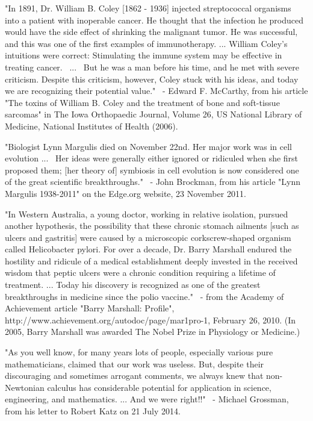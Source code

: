 \documentclass[12pt]{article}
\begin{document}
"In 1891, Dr. William B. Coley [1862 - 1936] injected streptococcal organisms into a patient with inoperable cancer. He thought that the infection he produced would have the side effect of shrinking the malignant tumor. He was successful, and this was one of the first examples of immunotherapy. ... William Coley's intuitions were correct: Stimulating the immune system may be effective in treating cancer.  ...  But he was a man before his time, and he met with severe criticism. Despite this criticism, however, Coley stuck with his ideas, and today we are recognizing their potential value."
 - Edward F. McCarthy, from his article "The toxins of William B. Coley and the treatment of bone and soft-tissue sarcomas" in The Iowa Orthopaedic Journal, Volume 26, US National Library of Medicine, National Institutes of Health (2006).

"Biologist Lynn Margulis died on November 22nd. Her major work was in cell evolution ...  Her ideas were generally either ignored or ridiculed when she first proposed them; [her theory of] symbiosis in cell evolution is now considered one of the great scientific breakthroughs."
 - John Brockman, from his article "Lynn Margulis 1938-2011" on the Edge.org website, 23 November 2011. 

"In Western Australia, a young doctor, working in relative isolation, pursued another hypothesis, the possibility that these chronic stomach ailments [such as ulcers and gastritis] were caused by a microscopic corkscrew-shaped organism called Helicobacter pylori. For over a decade, Dr. Barry Marshall endured the hostility and ridicule of a medical establishment deeply invested in the received wisdom that peptic ulcers were a chronic condition requiring a lifetime of treatment. ... Today his discovery is recognized as one of the greatest breakthroughs in medicine since the polio vaccine."
 - from the Academy of Achievement article "Barry Marshall: Profile", http://www.achievement.org/autodoc/page/mar1pro-1, February 26, 2010. (In 2005, Barry Marshall was awarded The Nobel Prize in Physiology or Medicine.)

"As you well know, for many years lots of people, especially various pure mathematicians, claimed that our work was useless. But, despite their discouraging and sometimes arrogant comments, we always knew that non-Newtonian calculus has considerable potential for application in science, engineering, and mathematics. ... And we were right!!"
 - Michael Grossman, from his letter to Robert Katz on 21 July 2014. 
\end{document}
